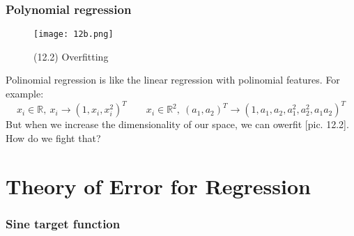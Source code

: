 \subsubsection*{Polynomial regression}

\begin{wrapfigure}{r}{0.25\linewidth}
	\vspace{-2.5cm}
  \begin{center}
    \texttt{[image: 12b.png]}
  \end{center}
  \vspace{-0.8cm}
  \caption*{(12.2) Overfitting}
  \vspace{-2cm}
\end{wrapfigure}
Polinomial regression is like the linear regression with polinomial features. For example:
$$x_i\in\mathbb{R},\ x_i\to(1,x_i,x_i^2)^T \qquad
x_i\in\mathbb{R}^2,\ (a_1, a_2)^T\to(1,a_1,a_2,a_1^2,a_2^2,a_1a_2)^T$$
But when we increase the dimensionality of our space, we can owerfit [pic. 12.2]. How do we fight that?

\newpage
\section{Theory of Error for Regression}
\vspace{-0.6cm}
\subsubsection*{Sine target function}

